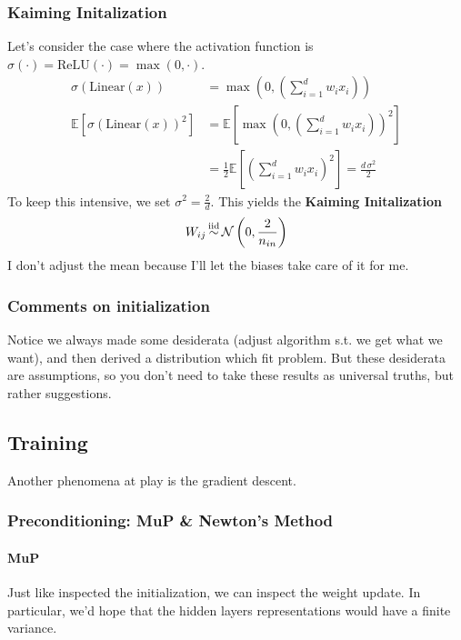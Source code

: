 \subsubsection{Kaiming Initalization}
Let's consider the case where the activation function is $\sigma(\cdot) = \text{ReLU}(\cdot) = \max(0, \cdot)$. 
\begin{align}
	\sigma(\text{Linear}(x)) & = \max\left(0, \left( \sum_{i=1}^d w_i x_i \right) \right)\\
	\mathbb E[\sigma(\text{Linear}(x))^2] & = \mathbb E \left[ \max\left(0, \left( \sum_{i=1}^d w_i x_i \right) \right)^2 \right]\\
	& = \frac{1}{2} \mathbb E \left[\left( \sum_{i=1}^d w_i x_i \right)^2 \right] = \frac{d \, \sigma^2}{2}
\end{align} 
To keep this intensive, we set $\sigma^2 = \frac{2}{d}$. This yields the \textbf{Kaiming Initalization}
\begin{align}
	W_{ij} \operatorname{\stackrel{\mathrm{iid}}{\sim}} \mathcal N \left( 0 , \frac{2}{n_{in}} \right)
\end{align}
I don't adjust the mean because I'll let the biases take care of it for me.

\subsubsection{Comments on initialization}
Notice we always made some desiderata (adjust algorithm s.t. we get what we want), and then derived a distribution which fit problem. But these desiderata are assumptions, so you don't need to take these results as universal truths, but rather suggestions. 

\subsection{Training}
Another phenomena at play is the gradient descent.

\subsubsection{Preconditioning: MuP \& Newton's Method}

\paragraph{MuP}
Just like inspected the initialization, we can inspect the weight update. In particular, we'd hope that the hidden layers representations would have a finite variance.

